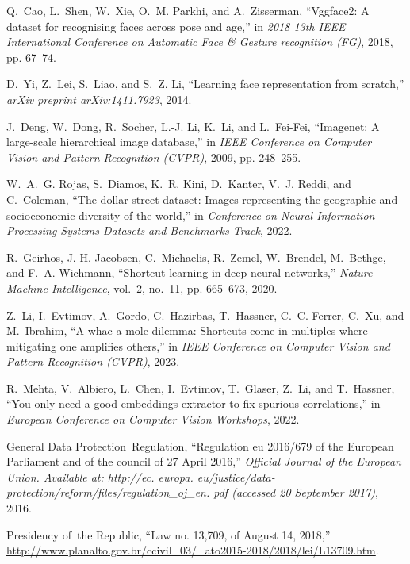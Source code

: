 \documentclass[journal]{IEEEtran}
\begin{document}
\begin{thebibliography}{100}
Q.~Cao, L.~Shen, W.~Xie, O.~M. Parkhi, and A.~Zisserman, ``Vggface2: A dataset
for recognising faces across pose and age,'' in \emph{2018 13th IEEE
International Conference on Automatic Face \& Gesture recognition (FG)}, 2018, pp. 67--74.

D.~Yi, Z.~Lei, S.~Liao, and S.~Z. Li, ``Learning face representation from
scratch,'' \emph{arXiv preprint arXiv:1411.7923}, 2014.

J.~Deng, W.~Dong, R.~Socher, L.-J. Li, K.~Li, and L.~Fei-Fei, ``Imagenet: A
large-scale hierarchical image database,'' in \emph{IEEE Conference on Computer Vision and Pattern Recognition (CVPR)}, 2009, pp. 248--255.

W.~A.~G. Rojas, S.~Diamos, K.~R. Kini, D.~Kanter, V.~J. Reddi, and C.~Coleman,
``The dollar street dataset: Images representing the geographic and socioeconomic diversity of the world,'' in \emph{Conference on Neural
Information Processing Systems Datasets and Benchmarks Track}, 2022.

R.~Geirhos, J.-H. Jacobsen, C.~Michaelis, R.~Zemel, W.~Brendel, M.~Bethge, and
F.~A. Wichmann, ``Shortcut learning in deep neural networks,'' \emph{Nature
Machine Intelligence}, vol.~2, no.~11, pp. 665--673, 2020.

Z.~Li, I.~Evtimov, A.~Gordo, C.~Hazirbas, T.~Hassner, C.~C. Ferrer, C.~Xu, and
M.~Ibrahim, ``A whac-a-mole dilemma: Shortcuts come in multiples where
mitigating one amplifies others,'' in \emph{IEEE Conference on Computer Vision and Pattern
Recognition (CVPR)}, 2023.

R.~Mehta, V.~Albiero, L.~Chen, I.~Evtimov, T.~Glaser, Z.~Li, and T.~Hassner,
``You only need a good embeddings extractor to fix spurious correlations,''
in \emph{European Conference on Computer Vision Workshops}, 2022.

\relax General Data Protection~Regulation, ``Regulation eu 2016/679 of the
European Parliament and of the council of 27 April 2016,'' \emph{Official
Journal of the European Union. Available at: http://ec. europa.
eu/justice/data-protection/reform/files/regulation\_oj\_en. pdf (accessed 20
September 2017)}, 2016.

\relax Presidency of~the Republic, ``Law no. 13,709, of August 14, 2018,''
\url{http://www.planalto.gov.br/ccivil_03/_ato2015-2018/2018/lei/L13709.htm}.


\end{thebibliography}
\end{document}
